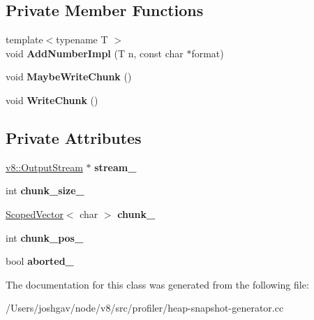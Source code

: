 \subsection*{Private Member Functions}
\begin{DoxyCompactItemize}
\item 
{\footnotesize template$<$typename T $>$ }\\void {\bfseries Add\+Number\+Impl} (T n, const char $\ast$format)\hypertarget{classv8_1_1internal_1_1_output_stream_writer_a57d8d8a7403365599448d3c6ef7b6d2d}{}\label{classv8_1_1internal_1_1_output_stream_writer_a57d8d8a7403365599448d3c6ef7b6d2d}

\item 
void {\bfseries Maybe\+Write\+Chunk} ()\hypertarget{classv8_1_1internal_1_1_output_stream_writer_af4b858d0169173495775114ca6c64a26}{}\label{classv8_1_1internal_1_1_output_stream_writer_af4b858d0169173495775114ca6c64a26}

\item 
void {\bfseries Write\+Chunk} ()\hypertarget{classv8_1_1internal_1_1_output_stream_writer_aff1c52a7fd56a7e50285d5fd3be8323b}{}\label{classv8_1_1internal_1_1_output_stream_writer_aff1c52a7fd56a7e50285d5fd3be8323b}

\end{DoxyCompactItemize}
\subsection*{Private Attributes}
\begin{DoxyCompactItemize}
\item 
\hyperlink{classv8_1_1_output_stream}{v8\+::\+Output\+Stream} $\ast$ {\bfseries stream\+\_\+}\hypertarget{classv8_1_1internal_1_1_output_stream_writer_ae3c563f550fb91a1b5c15dd512bc9b6f}{}\label{classv8_1_1internal_1_1_output_stream_writer_ae3c563f550fb91a1b5c15dd512bc9b6f}

\item 
int {\bfseries chunk\+\_\+size\+\_\+}\hypertarget{classv8_1_1internal_1_1_output_stream_writer_ac419c717a4bc01c4e9e925a8ab807d71}{}\label{classv8_1_1internal_1_1_output_stream_writer_ac419c717a4bc01c4e9e925a8ab807d71}

\item 
\hyperlink{classv8_1_1internal_1_1_scoped_vector}{Scoped\+Vector}$<$ char $>$ {\bfseries chunk\+\_\+}\hypertarget{classv8_1_1internal_1_1_output_stream_writer_adb586d4cdd82685571be1306b8d9addd}{}\label{classv8_1_1internal_1_1_output_stream_writer_adb586d4cdd82685571be1306b8d9addd}

\item 
int {\bfseries chunk\+\_\+pos\+\_\+}\hypertarget{classv8_1_1internal_1_1_output_stream_writer_a9cd442b7d6667fceec06ed8de8ebeaae}{}\label{classv8_1_1internal_1_1_output_stream_writer_a9cd442b7d6667fceec06ed8de8ebeaae}

\item 
bool {\bfseries aborted\+\_\+}\hypertarget{classv8_1_1internal_1_1_output_stream_writer_a6175485c6048e7057d680e7189ec76cd}{}\label{classv8_1_1internal_1_1_output_stream_writer_a6175485c6048e7057d680e7189ec76cd}

\end{DoxyCompactItemize}


The documentation for this class was generated from the following file\+:\begin{DoxyCompactItemize}
\item 
/\+Users/joshgav/node/v8/src/profiler/heap-\/snapshot-\/generator.\+cc\end{DoxyCompactItemize}
